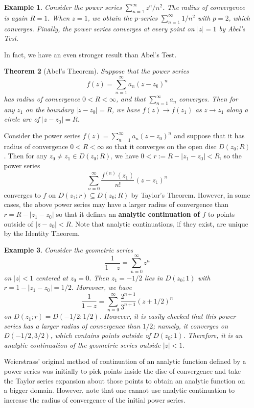 \documentclass[10pt]{article}
\theoremstyle{newstyle}
\newtheorem{thm}{Theorem}[section]
\newtheorem{exmp}[thm]{Example}
\begin{document}
\begin{exmp}
Consider the power series $\sum_{n=1}^\infty z^n/n^2$. The radius of convergence is again $R = 1$. 
When $z = 1$, we obtain the $p$-series $\sum_{n=1}^\infty 1/n^2$ with $p = 2$, which converges. Finally, 
the power series converges at every point on $|z| = 1$ by Abel's Test. 
\end{exmp}

In fact, we have an even stronger result than Abel's Test. 

\begin{thm}[Abel's Theorem]
Suppose that the power series 
\[ f(z) = \sum_{n=1}^\infty a_n(z-z_0)^n \]
has radius of convergence $0 < R < \infty$, and that $\sum_{n=1}^\infty a_n$ converges. 
Then for any $z_1$ on the boundary $|z-z_0| = R$, we have $f(z) \to f(z_1)$ 
as $z \to z_1$ along a circle arc of $|z-z_0| = R$. 
\end{thm}

Consider the power series $f(z) = \sum_{n=1}^\infty a_n(z-z_0)^n$ and suppose that it has radius 
of convergence $0 < R < \infty$ so that it converges on the open disc $D(z_0; R)$. Then for any 
$z_0 \neq z_1 \in D(z_0; R)$, we have $0 < r := R - |z_1 - z_0| < R$, so the power series 
\[ \sum_{n=0}^\infty \frac{f^{(n)}(z_1)}{n!} (z-z_1)^n  \]
converges to $f$ on $D(z_1; r) \subseteq D(z_0; R)$ by Taylor's Theorem. However, in some cases, 
the above power series may have a 
larger radius of convergence than $r = R - |z_1 - z_0|$ so that it defines an 
{\bf analytic continuation of $f$} to points outside of $|z-z_0| < R$. Note that 
analytic continuations, if they exist, are unique by the Identity Theorem. 

\begin{exmp}
Consider the geometric series 
\[ \frac{1}{1-z} = \sum_{n=0}^\infty z^n \]
on $|z| < 1$ centered at $z_0 = 0$. Then $z_1 = -1/2$ lies in $D(z_0; 1)$ with $r = 1-|z_1-z_0| = 1/2$. 
Moreover, we have 
\[ \frac{1}{1-z} = \sum_{n=0}^\infty \frac{2^{n+1}}{3^{n+1}} (z+1/2)^n \]
on $D(z_1; r) = D(-1/2; 1/2)$. However, it is easily checked that this power series has a 
larger radius of convergence than $1/2$; namely, it converges on $D(-1/2, 3/2)$, which contains 
points outside of $D(z_0; 1)$. Therefore, it is an analytic continuation of the geometric series 
outside $|z| < 1$. 
\end{exmp}

Weierstrass' original method of continuation of an analytic function defined by a 
power series was initially to pick points inside the disc of convergence and take the Taylor 
series expansion about those points to obtain an analytic function on a bigger domain. 
However, note that one cannot use analytic continuation to increase the radius of convergence 
of the initial power series. 
\end{document}
